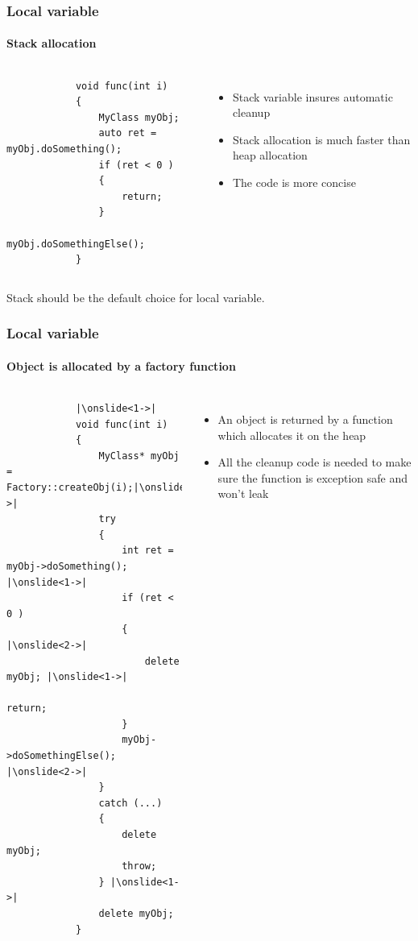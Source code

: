 \documentclass{beamer}
\begin{document}
\begin{frame}[fragile]
\frametitle{Local variable}
\framesubtitle{Stack allocation}
	\begin{columns}
		\begin{lstlisting}
			void func(int i)
			{
				MyClass myObj;
				auto ret = myObj.doSomething();
				if (ret < 0 )
				{
					return;
				}
				myObj.doSomethingElse();
			}
		\end{lstlisting}
			\begin{itemize}
			\item Stack variable insures automatic cleanup
			\item Stack allocation is much faster than heap allocation
			\item The code is more concise
			\end{itemize}
	\end{columns}
\end{frame}

\begin{frame}
    \begin{center}
        Stack should be the default choice for local variable.
    \end{center}
\end{frame}

\begin{frame}[fragile,t]
\frametitle{Local variable}
\framesubtitle{Object is allocated by a factory function}
	\begin{columns}[T]
	\column{0.5\textwidth}
	\setbeamercovered{transparent}
		\begin{lstlisting}
			|\onslide<1->|
			void func(int i)
			{
				MyClass* myObj = Factory::createObj(i);|\onslide<2->|
				try
				{
					int ret = myObj->doSomething(); |\onslide<1->|
					if (ret < 0 )
					{ |\onslide<2->|
						delete myObj; |\onslide<1->|
						return;
					}
					myObj->doSomethingElse(); |\onslide<2->|
				}
				catch (...)
				{
					delete myObj;
					throw;
				} |\onslide<1->|
				delete myObj;
			}
		\end{lstlisting}
	\column{0.5\textwidth}
		\begin{itemize}
			\item<1-> An object is returned by a function which allocates it
					  on the heap
			\item<2-> All the cleanup code is needed to make sure the function is
					  exception safe and won't leak
		\end{itemize}
	\end{columns}
\end{frame}
\end{document}
